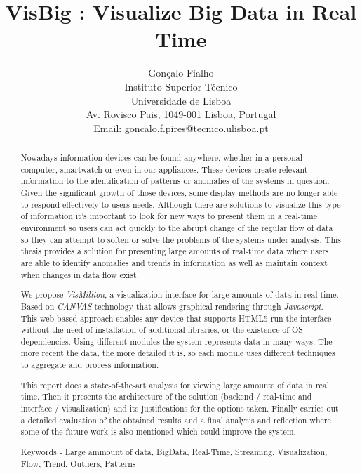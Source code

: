 \documentclass[letterpaper, 10 pt, conference]{ieeeconf}  %
\title{\LARGE \bf
VisBig : Visualize Big Data in Real Time
}
\author{Gonçalo Fialho \\ 
        Instituto Superior Técnico \\
        Universidade de Lisboa \\ 
        Av. Rovisco Pais, 1049-001 Lisboa, Portugal \\
        Email: goncalo.f.pires@tecnico.ulisboa.pt }
\begin{document}
\maketitle
\thispagestyle{plain}
\pagestyle{plain}


\begin{abstract}

Nowadays information devices can be found anywhere, whether in a personal computer, smartwatch or even in our appliances. These devices create relevant information to the identification of patterns or anomalies of the systems in question. Given the significant growth of those devices, some display methods are no longer able to respond effectively to users needs. Although there are solutions to visualize this type of information it's important to look for new ways to present them in a real-time environment so users can act quickly to the abrupt change of the regular flow of data so they can attempt to soften or solve the problems of the systems under analysis. This thesis provides a solution for presenting large amounts of real-time data where users are able to identify anomalies and trends in information as well as maintain context when changes in data flow exist.

We propose \textit{VisMillion}, a visualization interface for large amounts of data in real time. Based on \textit{CANVAS} technology that allows graphical rendering through \textit{Javascript}. This web-based approach enables any device that supports HTML5 run the interface without the need of installation of additional libraries, or the existence of OS dependencies. Using different modules the system represents data in many ways. The more recent the data, the more detailed it is, so each module uses different techniques to aggregate and process information. 

This report does a state-of-the-art analysis for viewing large amounts of data in real time. Then it presents the architecture of the solution (backend / real-time and interface / visualization) and its justifications for the options taken. Finally carries out a detailed evaluation of the obtained results and a final analysis and reflection where some of the future work is also mentioned which could improve the system.

Keywords -  Large ammount of data, BigData, Real-Time, Streaming, Visualization, Flow, Trend, Outliers, Patterns

\end{abstract}
\end{document}

